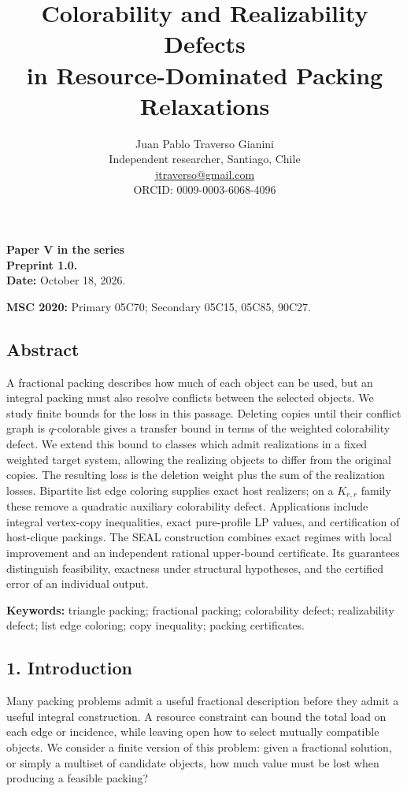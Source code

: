 \documentclass[english,11pt,a4paper]{article}
\title{Colorability and Realizability Defects\\in Resource-Dominated Packing Relaxations}
\author{Juan Pablo Traverso Gianini\\
\small Independent researcher, Santiago, Chile\\
\small \href{mailto:jtraverso@gmail.com}{jtraverso@gmail.com}\\
\small ORCID: 0009-0003-6068-4096}
\date{}
\begin{document}
\raggedbottom
\maketitle
\textbf{Paper V in the series}\\
\textbf{Preprint 1.0.}\\
\textbf{Date:} October 18, 2026.

\textbf{MSC 2020:} Primary 05C70; Secondary 05C15, 05C85, 90C27.

\subsection{Abstract}\label{abstract}

A fractional packing describes how much of each object can be used, but
an integral packing must also resolve conflicts between the selected
objects. We study finite bounds for the loss in this passage. Deleting
copies until their conflict graph is \(q\)-colorable gives a transfer
bound in terms of the weighted colorability defect. We extend this bound
to classes which admit realizations in a fixed weighted target system,
allowing the realizing objects to differ from the original copies. The
resulting loss is the deletion weight plus the sum of the realization
losses. Bipartite list edge coloring supplies exact host realizers; on a
\(K_{r,r}\) family these remove a quadratic auxiliary colorability
defect. Applications include integral vertex-copy inequalities, exact
pure-profile LP values, and certification of host-clique packings. The
SEAL construction combines exact regimes with local improvement and an
independent rational upper-bound certificate. Its guarantees distinguish
feasibility, exactness under structural hypotheses, and the certified
error of an individual output.

\textbf{Keywords:} triangle packing; fractional packing; colorability
defect; realizability defect; list edge coloring; copy inequality;
packing certificates.

\subsection{1. Introduction}\label{introduction}

Many packing problems admit a useful fractional description before they
admit a useful integral construction. A resource constraint can bound
the total load on each edge or incidence, while leaving open how to
select mutually compatible objects. We consider a finite version of this
problem: given a fractional solution, or simply a multiset of candidate
objects, how much value must be lost when producing a feasible packing?
\end{document}
